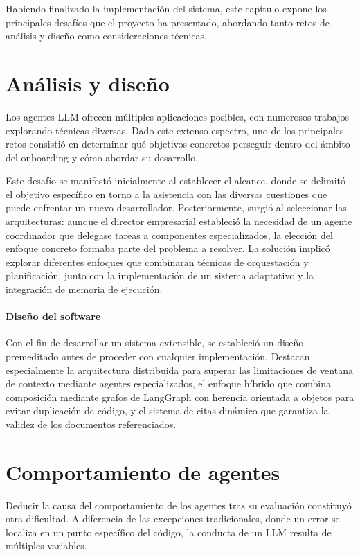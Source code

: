 Habiendo finalizado la implementación del sistema, este capítulo expone los principales desafíos que el proyecto ha presentado, abordando tanto retos de análisis y diseño como consideraciones técnicas.

\section{Análisis y diseño}
Los agentes LLM ofrecen múltiples aplicaciones posibles, con numerosos trabajos explorando técnicas diversas. Dado este extenso espectro, uno de los principales retos consistió en determinar qué objetivos concretos perseguir dentro del ámbito del onboarding y cómo abordar su desarrollo.

Este desafío se manifestó inicialmente al establecer el alcance, donde se delimitó el objetivo específico en torno a la asistencia con las diversas cuestiones que puede enfrentar un nuevo desarrollador. Posteriormente, surgió al seleccionar las arquitecturas: aunque el director empresarial estableció la necesidad de un agente coordinador que delegase tareas a componentes especializados, la elección del enfoque concreto formaba parte del problema a resolver. La solución implicó explorar diferentes enfoques que combinaran técnicas de orquestación y planificación, junto con la implementación de un sistema adaptativo y la integración de memoria de ejecución.

\paragraph{Diseño del software}
Con el fin de desarrollar un sistema extensible, se estableció un diseño premeditado antes de proceder con cualquier implementación. Destacan especialmente la arquitectura distribuida para superar las limitaciones de ventana de contexto mediante agentes especializados, el enfoque híbrido que combina composición mediante grafos de LangGraph con herencia orientada a objetos para evitar duplicación de código, y el sistema de citas dinámico que garantiza la validez de los documentos referenciados.

\section{Comportamiento de agentes}
Deducir la causa del comportamiento de los agentes tras su evaluación constituyó otra dificultad. A diferencia de las excepciones tradicionales, donde un error se localiza en un punto específico del código, la conducta de un LLM resulta de múltiples variables.

